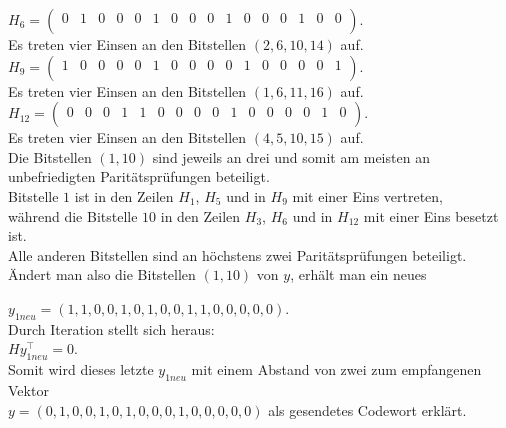 \begin{Beispiel}
        $H_6= \left( \begin{array}{rrrrrrrrrrrrrrrr}
            0 & 1 & 0 & 0 & 0 & 1 & 0 & 0 & 0 & 1 & 0 & 0 & 0 & 1 & 0 & 0 \\
           \end{array}\right). 
        $\\
        Es treten vier Einsen an den Bitstellen $(2, 6, 10, 14)$ auf.\\
        
        $H_9= \left( \begin{array}{rrrrrrrrrrrrrrrr}
            1 & 0 & 0 & 0 & 0 & 1 & 0 & 0 & 0 & 0 & 1 & 0 & 0 & 0 & 0 & 1 \\
           \end{array}\right). 
        $\\
        Es treten vier Einsen an den Bitstellen $(1, 6, 11, 16)$ auf.\\
        
        $H_{12}= \left( \begin{array}{rrrrrrrrrrrrrrrr}
            0 & 0 & 0 & 1 & 1 & 0 & 0 & 0 & 0 & 1 & 0 & 0 & 0 & 0 & 1 & 0 \\
           \end{array}\right). 
        $\\
        Es treten vier Einsen an den Bitstellen $(4, 5, 10, 15)$ auf.\\
        
        
        
        
        Die Bitstellen $(1, 10)$ sind jeweils an drei und somit am meisten an unbefriedigten Paritätsprüfungen beteiligt.\\ 
        Bitstelle $1$ ist in den Zeilen $H_1$, $H_5$ und in $H_9$ mit einer Eins vertreten,\\
        während die Bitstelle $10$ in den Zeilen $H_3$, $H_6$ und in $H_{12}$ mit einer Eins besetzt ist.\\ 
        Alle anderen Bitstellen sind an höchstens zwei Paritätsprüfungen beteiligt.\\
        
         
        Ändert man also die Bitstellen $(1, 10)$ von $y$, erhält man ein neues
        
        $y_{1neu} = (1,1,0,0,1,0,1,0,0,1,1,0,0,0,0,0).$\\
        
        Durch Iteration stellt sich heraus:\\
        $Hy_{1neu}^\intercal=0.$\\
        
        Somit wird dieses letzte $y_{1neu}$ mit einem Abstand von zwei 
        zum empfangenen Vektor\\ 
        $y = (0,1,0,0,1,0,1,0,0,0,1,0,0,0,0,0)$ als gesendetes Codewort erklärt.\\ 
        
    \end{Beispiel}
    
